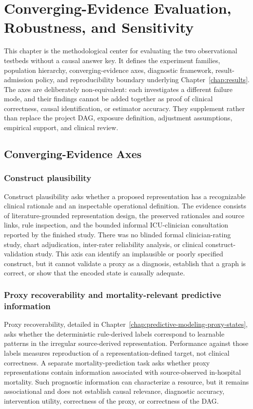 \chapter{Converging-Evidence Evaluation, Robustness, and Sensitivity}
\label{chap:robustness-sensitivity-validation-design}
\label{chap:experimental-design}

This chapter is the methodological center for evaluating the two observational testbeds without a causal answer key.  It defines the experiment families, population hierarchy, converging-evidence axes, diagnostic framework, result-admission policy, and reproducibility boundary underlying Chapter~\ref{chap:results}.  The axes are deliberately non-equivalent: each investigates a different failure mode, and their findings cannot be added together as proof of clinical correctness, causal identification, or estimator accuracy.  They supplement rather than replace the project DAG, exposure definition, adjustment assumptions, empirical support, and clinical review.

\section{Converging-Evidence Axes}

\subsection{Construct plausibility}

Construct plausibility asks whether a proposed representation has a recognizable clinical rationale and an inspectable operational definition.  The evidence consists of literature-grounded representation design, the preserved rationales and source links, rule inspection, and the bounded informal ICU-clinician consultation reported by the finished study.  There was no blinded formal clinician-rating study, chart adjudication, inter-rater reliability analysis, or clinical construct-validation study.  This axis can identify an implausible or poorly specified construct, but it cannot validate a proxy as a diagnosis, establish that a graph is correct, or show that the encoded state is causally adequate.

\subsection{Proxy recoverability and mortality-relevant predictive information}

Proxy recoverability, detailed in Chapter~\ref{chap:predictive-modeling-proxy-states}, asks whether the deterministic rule-derived labels correspond to learnable patterns in the irregular source-derived representation.  Performance against those labels measures reproduction of a representation-defined target, not clinical correctness.  A separate mortality-prediction task asks whether proxy representations contain information associated with source-observed in-hospital mortality.  Such prognostic information can characterize a resource, but it remains associational and does not establish causal relevance, diagnostic accuracy, intervention utility, correctness of the proxy, or correctness of the DAG.

